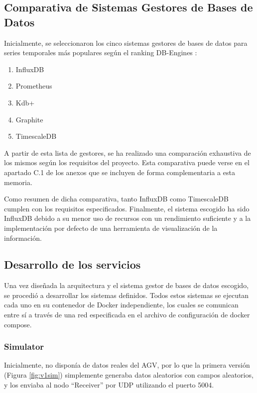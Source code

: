 
\subsection{Comparativa de Sistemas Gestores de Bases de Datos}

Inicialmente, se seleccionaron los cinco sistemas gestores de bases de datos para series temporales más populares 
según el ranking DB-Engines \cite{dbengines:rankingTSDBMS}:
\begin{enumerate}
    \item InfluxDB
    \item Prometheus
    \item Kdb+
    \item Graphite
    \item TimescaleDB
\end{enumerate}

A partir de esta lista de gestores, se ha realizado una comparación exhaustiva de los mismos según los requisitos 
del proyecto. Esta comparativa puede verse en el apartado C.1 de los anexos que se incluyen de forma complementaria 
a esta memoria.

Como resumen de dicha comparativa, tanto InfluxDB como TimescaleDB cumplen con los requisitos especificados. Finalmente,
el sistema escogido ha sido InfluxDB debido a su menor uso de recursos con un rendimiento suficiente y a 
la implementación por defecto de una herramienta de visualización de la información.

\subsection{Desarrollo de los servicios}

Una vez diseñada la arquitectura y el sistema gestor de bases de datos escogido, se procedió a desarrollar los
sistemas definidos. Todos estos sistemas se ejecutan cada uno en su contenedor de Docker independiente, los cuales 
se comunican entre sí a través de una red especificada en el archivo de configuración de docker compose.

\subsubsection{Simulator}
Inicialmente, no disponía de datos reales del AGV, por lo que la primera versión (Figura \ref{fig:v1sim}) simplemente generaba datos aleatorios
con campos aleatorios, y los enviaba al nodo ``Receiver'' por UDP utilizando el puerto 5004.

